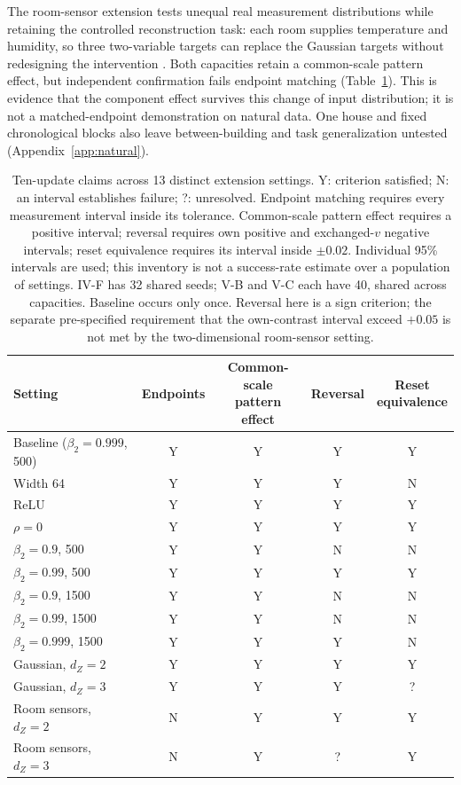The room-sensor extension tests unequal real measurement distributions while retaining the controlled reconstruction task: each room supplies temperature and humidity, so three two-variable targets can replace the Gaussian targets without redesigning the intervention \citep{candanedo2017data,candanedo2017dataset}. Both capacities retain a common-scale pattern effect, but independent confirmation fails endpoint matching (Table~\ref{tab:claims}). This is evidence that the component effect survives this change of input distribution; it is not a matched-endpoint demonstration on natural data. One house and fixed chronological blocks also leave between-building and task generalization untested (Appendix~\ref{app:natural}).

\begin{table}[t]
\centering\small
\caption{Ten-update claims across 13 distinct extension settings. Y: criterion satisfied; N: an interval establishes failure; ?: unresolved. Endpoint matching requires every measurement interval inside its tolerance. Common-scale pattern effect requires a positive interval; reversal requires own positive and exchanged-$v$ negative intervals; reset equivalence requires its interval inside $\pm0.02$. Individual 95\% intervals are used; this inventory is not a success-rate estimate over a population of settings. IV-F has 32 shared seeds; V-B and V-C each have 40, shared across capacities. Baseline occurs only once. Reversal here is a sign criterion; the separate pre-specified requirement that the own-contrast interval exceed $+0.05$ is not met by the two-dimensional room-sensor setting.}
\label{tab:claims}
\begin{tabular}{lcccc}
\toprule
Setting & Endpoints & \shortstack{Common-scale\\pattern effect} & Reversal & \shortstack{Reset\\equivalence}\\
\midrule
Baseline ($\beta_2=0.999$, 500) & Y & Y & Y & Y\\
Width 64 & Y & Y & Y & N\\
ReLU & Y & Y & Y & Y\\
$\rho=0$ & Y & Y & Y & Y\\
$\beta_2=0.9$, 500 & Y & Y & N & N\\
$\beta_2=0.99$, 500 & Y & Y & Y & Y\\
$\beta_2=0.9$, 1500 & Y & Y & N & N\\
$\beta_2=0.99$, 1500 & Y & Y & N & N\\
$\beta_2=0.999$, 1500 & Y & Y & Y & N\\
Gaussian, $d_Z=2$ & Y & Y & Y & Y\\
Gaussian, $d_Z=3$ & Y & Y & Y & ?\\
Room sensors, $d_Z=2$ & N & Y & Y & Y\\
Room sensors, $d_Z=3$ & N & Y & ? & Y\\
\bottomrule
\end{tabular}
\end{table}

